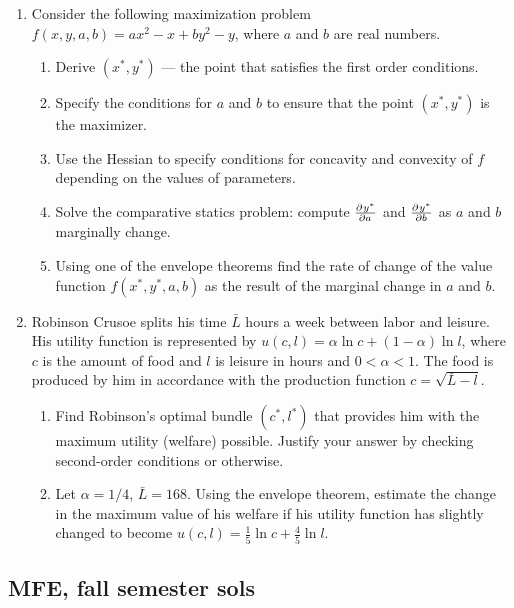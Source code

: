 \documentclass[12pt]{article} %
\theoremstyle{definition} %
\begin{document}
\begin{enumerate}
\addtocounter{enumi}{6}
\item Consider the following maximization problem $f(x,y,a,b)=ax^2-x+by^2-y$, where $a$ and $b$ are real numbers.
\begin{enumerate}
\item Derive $(x^*,y^*)$ --- the point that satisfies the first order conditions.
\item Specify the conditions for $a$ and $b$ to ensure that the point $(x^*,y^*)$ is the maximizer.
\item Use the Hessian to specify conditions for concavity and convexity of $f$ depending on the values of parameters.
\item Solve the comparative statics problem: compute $\pd{y^*}{a}$ and $\pd{y^*}{b}$  as $a$ and $b$ marginally change.
\item Using one of the envelope theorems find the rate of change of the value function $f(x^*,y^*,a,b)$ as the result of the marginal change in $a$ and $b$.
\end{enumerate}

\item Robinson Crusoe splits his time $\bar{L}$ hours a week between labor and leisure. His utility function is represented by $u(c,l)=\alpha \ln c+(1-\alpha)\ln l$, where $c$ is the amount of food and $l$ is leisure in hours and $0<\alpha<1$. The food is produced by him in accordance with the production function $c=\sqrt{\bar{L}-l}$.
\begin{enumerate}
\item Find Robinson’s optimal bundle $(c^*,l^*)$ that provides him with the maximum utility (welfare) possible. Justify your answer by checking second-order conditions or otherwise.
\item Let $\alpha=1/4$, $\bar{L}=168$. Using the envelope theorem, estimate the change in the maximum value of his welfare if his utility function has slightly changed to become $u(c,l)=\frac{1}{5} \ln c+\frac{4}{5}\ln l$.
\end{enumerate}

\end{enumerate}

\subsection{MFE, fall semester sols}
\end{document}
